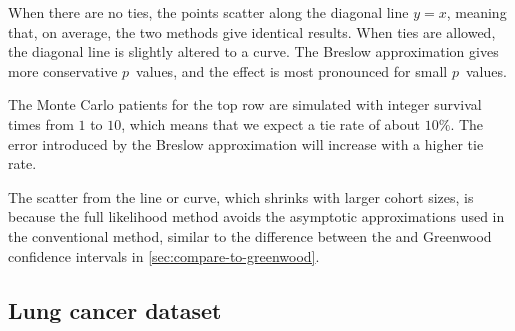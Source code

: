 \documentclass[article]{jss}
\begin{document}
When there are no ties, the points scatter along the diagonal line \(y=x\), meaning that, on average, the two methods give identical results. When ties are allowed, the diagonal line is slightly altered to a curve. The Breslow approximation gives more conservative \(p\)~values, and the effect is most pronounced for small \(p\)~values.

The Monte Carlo patients for the top row are simulated with integer survival times from \(1\) to \(10\), which means that we expect a tie rate of about \(10\%\). The error introduced by the Breslow approximation will increase with a higher tie rate.

The scatter from the line or curve, which shrinks with larger cohort sizes, is because the full likelihood method avoids the asymptotic approximations used in the conventional method, similar to the difference between the  and Greenwood confidence intervals in \cref{sec:compare-to-greenwood}.

\subsection{Lung cancer dataset}
\end{document}

